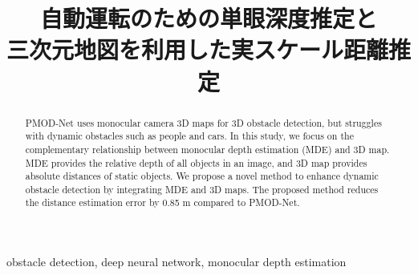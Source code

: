 \documentclass[paper]{jrsj}
\title{自動運転のための単眼深度推定と\protect\\
三次元地図を利用した実スケール距離推定}
\begin{document}
\begin{abstract}
    PMOD-Net uses monocular camera 3D maps for 3D obstacle detection, but struggles with dynamic obstacles such as people
and cars. In this study, we focus on the complementary relationship between monocular depth estimation (MDE) and 3D map.
MDE provides the relative depth of all objects in an image, and 3D map provides absolute distances of static objects. We propose
a novel method to enhance dynamic obstacle detection by integrating MDE and 3D maps. The proposed method reduces the
distance estimation error by 0.85 m compared to PMOD-Net.
\end{abstract}
\begin{keywords}
    obstacle detection, deep neural network, monocular depth estimation
\end{keywords}
\maketitle



   
\end{document}
